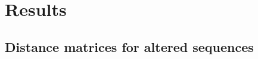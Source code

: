 \section{Results}

\subsection{Distance matrices for altered sequences}

\begin{adjustbox}{center}

\end{adjustbox}

\begin{adjustbox}{center}

\end{adjustbox}

\begin{adjustbox}{center}

\end{adjustbox}

\begin{adjustbox}{center}

\end{adjustbox}
